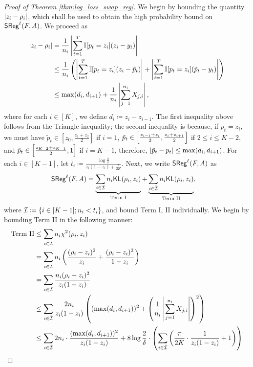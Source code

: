 \begin{proof}[Proof of Theorem \ref{thm:log_loss_swap_reg}]
    
    We begin by bounding the quantity $\left\lvert z_{i} - \rho_{i}\right\rvert$, which shall be used to obtain the high probability bound on $\mathsf{SReg}^{\ell}(F, A)$. We proceed as \begin{align*}
        \left\lvert z_{i} - \rho_{i}\right\rvert &= \frac{1}{n_{i}}\left\lvert\sum_{t = 1} ^ {T} \mathbb{I}{\left[p_{t} = z_{i}\right]} (z_{i} - y_{t})\right\rvert \\
        &\le \frac{1}{n_{i}} \left( \left\lvert\sum_{t = 1} ^ {T} \mathbb{I}{\left[p_{t} = z_{i}\right]} (z_{i} - \tilde{p}_{t})\right\rvert + \left\lvert\sum_{t = 1} ^ {T}\mathbb{I}{\left[p_{t} = z_{i}\right]} (\tilde{p}_{t} - y_{t})\right\rvert \right) \\
        &\le \max(d_{i}, d_{i + 1}) + \frac{1}{n_{i}}\left\lvert\sum_{j = 1} ^ {n_{i}} X_{j, i}\right\rvert,
    \end{align*}
    where for each $i \in [K]$, we define $d_{i} \coloneqq z_{i} - z_{i - 1}$. The first inequality above follows from the Triangle inequality; the second inequality is because, if $p_{t} = z_{i}$, we must have $\tilde{p}_{t} \in [z_{0}, \frac{z_{1} + z_{2}}{2}]$ if $i = 1$, $\tilde{p}_{t} \in \left[ \frac{z_{i - 1} + z_{i}}{2}, \frac{z_{i} + z_{i + 1}}{2} \right]$ if $2 \le i \le K - 2$, and $\tilde{p}_{t} \in \left[ \frac{z_{K - 2} + z_{K - 1}}{2}, 1 \right]$ if $i = K - 1$, therefore, $\left\lvert\tilde{p}_{t} - p_{t}\right\rvert \le \max(d_{i}, d_{i + 1})$. For each $i \in [K - 1]$, let $t_{i} \coloneqq \frac{\log \frac{2}{\delta}}{z_{i}(1 - z_{i}) + \frac{\pi}{2K}}$. Next, we write $\mathsf{SReg}^{\ell}(F, A)$ as \begin{align*}
       \mathsf{SReg}^{\ell}(F, A) &= 
       {\underbrace{\sum_{i \in \mathcal{I}} n_{i} \mathsf{KL}(\rho_{i}, z_{i})}_{\text{Term I}} + \underbrace{\sum_{i \in \bar{\mathcal{I}}} n_{i} \mathsf{KL}(\rho_{i}, z_{i})}_{\text{Term II}}}, 
    \end{align*}
    where $\mathcal{I} \coloneqq \{i \in [K - 1]; n_{i} < t_{i}\}$, and bound Term I, II individually. We begin by bounding Term II in the following manner: \begin{align*}
        \text{Term II} &\le {\sum_{i \in \bar{\cI}} n_{i} \chi ^ {2} (\rho_{i}, z_{i})} \\
        &= {\sum_{i \in \bar{\cI}} n_{i}\bigc{\frac{(\rho_{i} - z_{i}) ^ {2}}{z_{i}} + \frac{(\rho_{i} - z_{i}) ^ {2}}{1 - z_{i}}}} \\
        &= {\sum_{i \in \bar{\cI}} \frac{n_{i}(\rho_{i} - z_{i}) ^ {2}}{z_{i}(1 - z_{i})}} \\
        &\le {\sum_{i \in \bar{\cI}} \frac{2n_{i}}{z_{i}(1 - z_{i})} \bigc{(\max(d_{i}, d_{i + 1})) ^ {2} + \bigc{\frac{1}{n_{i}}\abs{\sum_{j = 1} ^ {n_{i}} X_{j, i}}} ^ {2}}} \\
        &\le \sum_{i \in \bar{\cI}} 2n_{i} \cdot \frac{(\max(d_{i}, d_{i + 1})) ^ {2}}{z_{i}(1 - z_{i})} + 8\log \frac{2}{\delta} \cdot \bigc{\sum_{i \in \bar{\cI}} \bigc{\frac{\pi}{2K} \cdot \frac{1}{z_{i}(1 - z_{i})} + 1}} \\

\end{align*}
\end{proof}

